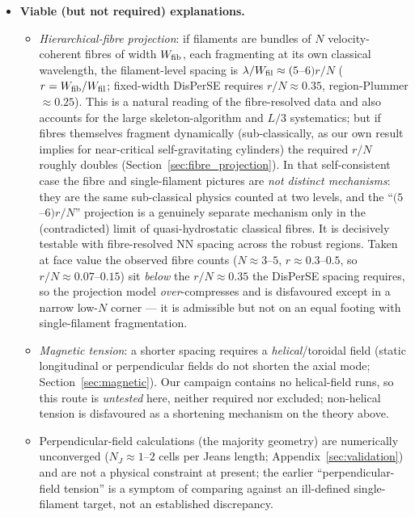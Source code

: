 \documentclass[usenatbib,twoside,twocolumn]{mnras}
\begin{document}
\begin{itemize}
    \item \textbf{Viable (but not required) explanations.}
    \begin{itemize}
        \item \emph{Hierarchical-fibre projection}: if filaments are bundles of $N$ velocity-coherent fibres of width $W_{\rm fib}$, each fragmenting at its own classical wavelength, the filament-level spacing is $\lambda/W_{\rm fil}\approx(5$--$6)r/N$ ($r=W_{\rm fib}/W_{\rm fil}$; fixed-width DisPerSE requires $r/N\approx0.35$, region-Plummer $\approx0.25$). This is a natural reading of the fibre-resolved data \citep{Yang2024,Hacar2013} and also accounts for the large skeleton-algorithm and $L/3$ systematics; but if fibres themselves fragment dynamically (sub-classically, as our own result implies for near-critical self-gravitating cylinders) the required $r/N$ roughly doubles (Section~\ref{sec:fibre_projection}). In that self-consistent case the fibre and single-filament pictures are \emph{not distinct mechanisms}: they are the same sub-classical physics counted at two levels, and the ``$(5$--$6)r/N$'' projection is a genuinely separate mechanism only in the (contradicted) limit of quasi-hydrostatic classical fibres. It is decisively testable with fibre-resolved NN spacing across the robust regions. Taken at face value the observed fibre counts ($N\approx3$--$5$, $r\approx0.3$--$0.5$, so $r/N\approx0.07$--$0.15$) sit \emph{below} the $r/N\approx0.35$ the DisPerSE spacing requires, so the projection model \emph{over}-compresses and is disfavoured except in a narrow low-$N$ corner --- it is admissible but not on an equal footing with single-filament fragmentation.
        \item \emph{Magnetic tension}: a shorter spacing requires a \emph{helical}/toroidal field \citep{Fiege2000} (static longitudinal or perpendicular fields do not shorten the axial mode; Section~\ref{sec:magnetic}). Our campaign contains no helical-field runs, so this route is \emph{untested} here, neither required nor excluded; non-helical tension is disfavoured as a shortening mechanism on the theory above.
        \item Perpendicular-field calculations (the majority geometry) are numerically unconverged ($N_J\approx1$--$2$ cells per Jeans length; Appendix~\ref{sec:validation}) and are not a physical constraint at present; the earlier ``perpendicular-field tension'' is a symptom of comparing against an ill-defined single-filament target, not an established discrepancy.
    \end{itemize}


\end{itemize}
\end{document}
